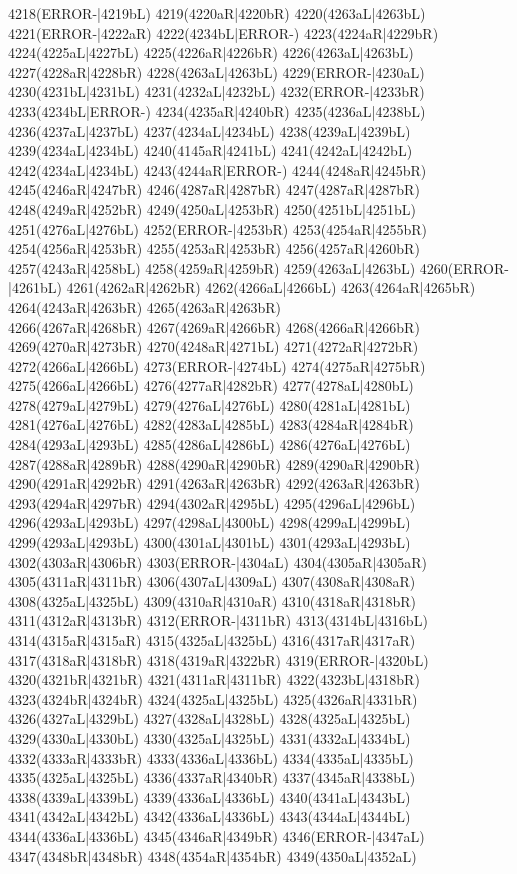 4218(ERROR-|4219bL) 4219(4220aR|4220bR) 4220(4263aL|4263bL) \\4221(ERROR-|4222aR) 4222(4234bL|ERROR-) 4223(4224aR|4229bR) 4224(4225aL|4227bL) 4225(4226aR|4226bR) 4226(4263aL|4263bL) 4227(4228aR|4228bR) 4228(4263aL|4263bL) 4229(ERROR-|4230aL) \\4230(4231bL|4231bL) 4231(4232aL|4232bL) 4232(ERROR-|4233bR) 4233(4234bL|ERROR-) 4234(4235aR|4240bR) 4235(4236aL|4238bL) 4236(4237aL|4237bL) 4237(4234aL|4234bL) 4238(4239aL|4239bL) \\4239(4234aL|4234bL) 4240(4145aR|4241bL) 4241(4242aL|4242bL) 4242(4234aL|4234bL) 4243(4244aR|ERROR-) 4244(4248aR|4245bR) 4245(4246aR|4247bR) 4246(4287aR|4287bR) 4247(4287aR|4287bR) \\4248(4249aR|4252bR) 4249(4250aL|4253bR) 4250(4251bL|4251bL) 4251(4276aL|4276bL) 4252(ERROR-|4253bR) 4253(4254aR|4255bR) 4254(4256aR|4253bR) 4255(4253aR|4253bR) 4256(4257aR|4260bR) \\4257(4243aR|4258bL) 4258(4259aR|4259bR) 4259(4263aL|4263bL) 4260(ERROR-|4261bL) 4261(4262aR|4262bR) 4262(4266aL|4266bL) 4263(4264aR|4265bR) 4264(4243aR|4263bR) 4265(4263aR|4263bR) \\4266(4267aR|4268bR) 4267(4269aR|4266bR) 4268(4266aR|4266bR) 4269(4270aR|4273bR) 4270(4248aR|4271bL) 4271(4272aR|4272bR) 4272(4266aL|4266bL) 4273(ERROR-|4274bL) 4274(4275aR|4275bR) \\4275(4266aL|4266bL) 4276(4277aR|4282bR) 4277(4278aL|4280bL) 4278(4279aL|4279bL) 4279(4276aL|4276bL) 4280(4281aL|4281bL) 4281(4276aL|4276bL) 4282(4283aL|4285bL) 4283(4284aR|4284bR) \\4284(4293aL|4293bL) 4285(4286aL|4286bL) 4286(4276aL|4276bL) 4287(4288aR|4289bR) 4288(4290aR|4290bR) 4289(4290aR|4290bR) 4290(4291aR|4292bR) 4291(4263aR|4263bR) 4292(4263aR|4263bR) \\4293(4294aR|4297bR) 4294(4302aR|4295bL) 4295(4296aL|4296bL) 4296(4293aL|4293bL) 4297(4298aL|4300bL) 4298(4299aL|4299bL) 4299(4293aL|4293bL) 4300(4301aL|4301bL) 4301(4293aL|4293bL) \\4302(4303aR|4306bR) 4303(ERROR-|4304aL) 4304(4305aR|4305aR) 4305(4311aR|4311bR) 4306(4307aL|4309aL) 4307(4308aR|4308aR) 4308(4325aL|4325bL) 4309(4310aR|4310aR) 4310(4318aR|4318bR) \\4311(4312aR|4313bR) 4312(ERROR-|4311bR) 4313(4314bL|4316bL) 4314(4315aR|4315aR) 4315(4325aL|4325bL) 4316(4317aR|4317aR) 4317(4318aR|4318bR) 4318(4319aR|4322bR) 4319(ERROR-|4320bL) \\4320(4321bR|4321bR) 4321(4311aR|4311bR) 4322(4323bL|4318bR) 4323(4324bR|4324bR) 4324(4325aL|4325bL) 4325(4326aR|4331bR) 4326(4327aL|4329bL) 4327(4328aL|4328bL) 4328(4325aL|4325bL) \\4329(4330aL|4330bL) 4330(4325aL|4325bL) 4331(4332aL|4334bL) 4332(4333aR|4333bR) 4333(4336aL|4336bL) 4334(4335aL|4335bL) 4335(4325aL|4325bL) 4336(4337aR|4340bR) 4337(4345aR|4338bL) \\4338(4339aL|4339bL) 4339(4336aL|4336bL) 4340(4341aL|4343bL) 4341(4342aL|4342bL) 4342(4336aL|4336bL) 4343(4344aL|4344bL) 4344(4336aL|4336bL) 4345(4346aR|4349bR) 4346(ERROR-|4347aL) \\4347(4348bR|4348bR) 4348(4354aR|4354bR) 4349(4350aL|4352aL) 